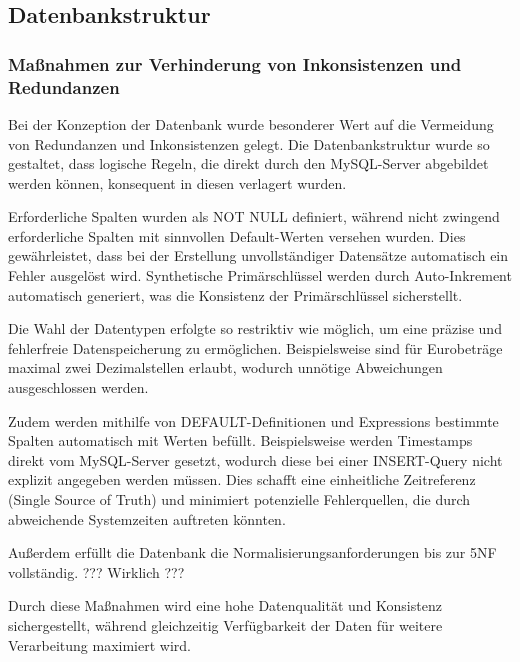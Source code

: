 \documentclass[12pt]{article}
\begin{document}
\subsection{Datenbankstruktur}


\subsubsection{Maßnahmen zur Verhinderung von Inkonsistenzen und Redundanzen}
\label{sec:measures_to_prevent_inconsistencies_and_redundancies}
Bei der Konzeption der Datenbank wurde besonderer Wert auf die Vermeidung von Redundanzen und Inkonsistenzen gelegt. Die Datenbankstruktur wurde so gestaltet, dass logische Regeln, die direkt durch den MySQL-Server abgebildet werden können, konsequent in diesen verlagert wurden.

Erforderliche Spalten wurden als NOT NULL definiert, während nicht zwingend erforderliche Spalten mit sinnvollen Default-Werten versehen wurden. Dies gewährleistet, dass bei der Erstellung unvollständiger Datensätze automatisch ein Fehler ausgelöst wird. Synthetische Primärschlüssel werden durch Auto-Inkrement automatisch generiert, was die Konsistenz der Primärschlüssel sicherstellt.

Die Wahl der Datentypen erfolgte so restriktiv wie möglich, um eine präzise und fehlerfreie Datenspeicherung zu ermöglichen. Beispielsweise sind für Eurobeträge maximal zwei Dezimalstellen erlaubt, wodurch unnötige Abweichungen ausgeschlossen werden.

Zudem werden mithilfe von DEFAULT-Definitionen und Expressions bestimmte Spalten automatisch mit Werten befüllt. Beispielsweise werden Timestamps direkt vom MySQL-Server gesetzt, wodurch diese bei einer INSERT-Query nicht explizit angegeben werden müssen. Dies schafft eine einheitliche Zeitreferenz (Single Source of Truth) und minimiert potenzielle Fehlerquellen, die durch abweichende Systemzeiten auftreten könnten.

Außerdem erfüllt die Datenbank die Normalisierungsanforderungen bis zur \ac{5NF} vollständig. ??? Wirklich ???

Durch diese Maßnahmen wird eine hohe Datenqualität und Konsistenz sichergestellt, während gleichzeitig Verfügbarkeit der Daten für weitere Verarbeitung maximiert wird.
\end{document}

